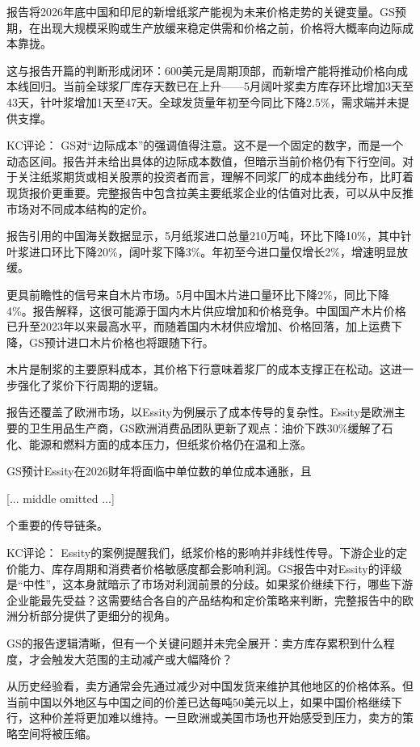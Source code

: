 \documentclass[11pt]{ctexart}
\begin{document}
报告将2026年底中国和印尼的新增纸浆产能视为未来价格走势的关键变量。GS预期，在出现大规模采购或生产放缓来稳定供需和价格之前，价格将大概率向边际成本靠拢。

这与报告开篇的判断形成闭环：600美元是周期顶部，而新增产能将推动价格向成本线回归。当前全球浆厂库存天数已在上升——5月阔叶浆卖方库存环比增加3天至43天，针叶浆增加1天至47天。全球发货量年初至今同比下降2.5\%，需求端并未提供支撑。

KC评论： GS对“边际成本”的强调值得注意。这不是一个固定的数字，而是一个动态区间。报告并未给出具体的边际成本数值，但暗示当前价格仍有下行空间。对于关注纸浆期货或相关股票的投资者而言，理解不同浆厂的成本曲线分布，比盯着现货报价更重要。完整报告中包含拉美主要纸浆企业的估值对比表，可以从中反推市场对不同成本结构的定价。

报告引用的中国海关数据显示，5月纸浆进口总量210万吨，环比下降10\%，其中针叶浆进口环比下降20\%，阔叶浆下降3\%。年初至今进口量仅增长2\%，增速明显放缓。

更具前瞻性的信号来自木片市场。5月中国木片进口量环比下降2\%，同比下降4\%。报告解释，这很可能源于国内木片供应增加和价格竞争。中国国产木片价格已升至2023年以来最高水平，而随着国内木材供应增加、价格回落，加上运费下降，GS预计进口木片价格也将跟随下行。

木片是制浆的主要原料成本，其价格下行意味着浆厂的成本支撑正在松动。这进一步强化了浆价下行周期的逻辑。

报告还覆盖了欧洲市场，以Essity为例展示了成本传导的复杂性。Essity是欧洲主要的卫生用品生产商，GS欧洲消费品团队更新了观点：油价下跌30\%缓解了石化、能源和燃料方面的成本压力，但纸浆价格仍在温和上涨。

GS预计Essity在2026财年将面临中单位数的单位成本通胀，且

[... middle omitted ...]

个重要的传导链条。

KC评论： Essity的案例提醒我们，纸浆价格的影响并非线性传导。下游企业的定价能力、库存周期和消费者价格敏感度都会影响利润。GS报告中对Essity的评级是“中性”，这本身就暗示了市场对利润前景的分歧。如果浆价继续下行，哪些下游企业能最先受益？这需要结合各自的产品结构和定价策略来判断，完整报告中的欧洲分析部分提供了更细分的视角。

GS的报告逻辑清晰，但有一个关键问题并未完全展开：卖方库存累积到什么程度，才会触发大范围的主动减产或大幅降价？

从历史经验看，卖方通常会先通过减少对中国发货来维护其他地区的价格体系。但当前中国以外地区与中国之间的价差已达每吨50美元以上，如果中国价格继续下行，这种价差将更加难以维持。一旦欧洲或美国市场也开始感受到压力，卖方的策略空间将被压缩。
\end{document}
